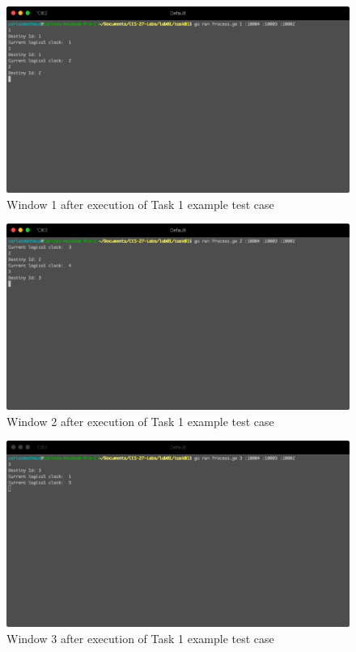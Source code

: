 \documentclass[a4paper, 11pt]{article}
\begin{document}
\begin{figure}[h]
  \begin{center}
  \includegraphics[width=5in]{./imgs/example_task1_window1.png}
  \caption{Window 1 after execution of Task 1 example test case}
  \label{img_example_task1_window1}
  \end{center}
\end{figure}

\begin{figure}[h]
  \begin{center}
  \includegraphics[width=5in]{./imgs/example_task1_window2.png}
  \caption{Window 2 after execution of Task 1 example test case}
  \label{img_example_task1_window2}
  \end{center}
\end{figure}

\begin{figure}[h]
  \begin{center}
  \includegraphics[width=5in]{./imgs/example_task1_window3.png}
  \caption{Window 3 after execution of Task 1 example test case}
  \label{img_example_task1_window3}
  \end{center}
\end{figure}
\end{document}
